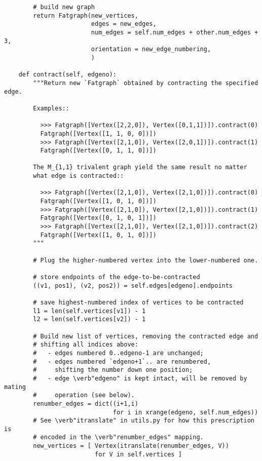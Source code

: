 \begin{lstlisting}
        # build new graph 
        return Fatgraph(new_vertices,
                        edges = new_edges,
                        num_edges = self.num_edges + other.num_edges + 3,
                        orientation = new_edge_numbering,
                        )

    def contract(self, edgeno):
        """Return new `Fatgraph` obtained by contracting the specified edge.

        Examples::

          >>> Fatgraph([Vertex([2,2,0]), Vertex([0,1,1])]).contract(0)
          Fatgraph([Vertex([1, 1, 0, 0])])
          >>> Fatgraph([Vertex([2,1,0]), Vertex([2,0,1])]).contract(1)
          Fatgraph([Vertex([0, 1, 1, 0])])

        The M_{1,1} trivalent graph yield the same result no matter
        what edge is contracted::

          >>> Fatgraph([Vertex([2,1,0]), Vertex([2,1,0])]).contract(0)
          Fatgraph([Vertex([1, 0, 1, 0])])
          >>> Fatgraph([Vertex([2,1,0]), Vertex([2,1,0])]).contract(1)
          Fatgraph([Vertex([0, 1, 0, 1])])
          >>> Fatgraph([Vertex([2,1,0]), Vertex([2,1,0])]).contract(2)
          Fatgraph([Vertex([1, 0, 1, 0])])
        """

        # Plug the higher-numbered vertex into the lower-numbered one.
        
        # store endpoints of the edge-to-be-contracted
        ((v1, pos1), (v2, pos2)) = self.edges[edgeno].endpoints

        # save highest-numbered index of vertices to be contracted
        l1 = len(self.vertices[v1]) - 1
        l2 = len(self.vertices[v2]) - 1

        # Build new list of vertices, removing the contracted edge and
        # shifting all indices above:
        #   - edges numbered 0..edgeno-1 are unchanged;
        #   - edges numbered `edgeno+1`.. are renumbered, 
        #     shifting the number down one position;
        #   - edge \verb"edgeno" is kept intact, will be removed by mating
        #     operation (see below).
        renumber_edges = dict((i+1,i)
                              for i in xrange(edgeno, self.num_edges))
        # See \verb"itranslate" in utils.py for how this prescription is
        # encoded in the \verb"renumber_edges" mapping.
        new_vertices = [ Vertex(itranslate(renumber_edges, V))
                         for V in self.vertices ]


\end{lstlisting}
